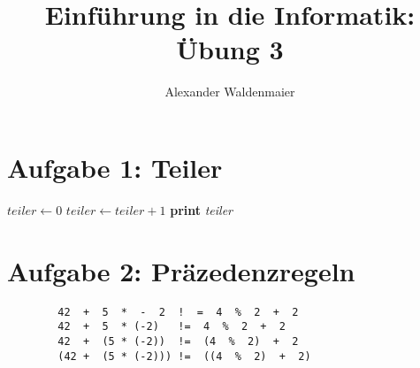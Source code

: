 \documentclass{article}
\title{Einführung in die Informatik: Übung 3}
\author{Alexander Waldenmaier}
\begin{document}
    \maketitle

    \section*{Aufgabe 1: Teiler}
    \begin{algorithm}
        \begin{algorithmic}[1]
                \State $\textit{teiler} \gets 0$
                        \State $\textit{teiler} \gets \textit{teiler}  + 1$
                    \EndIf
                \EndFor
                \State \textbf{print} \textit{teiler}
            \EndFor
            \EndProcedure
            \end{algorithmic}
    \end{algorithm}
   

    \section*{Aufgabe 2: Präzedenzregeln}
    \begin{lstlisting}
        42  +  5  *  -  2  !  =  4  %  2  +  2
        42  +  5  * (-2)   !=  4  %  2  +  2
        42  +  (5 * (-2))  !=  (4  %  2)  +  2
        (42 +  (5 * (-2))) !=  ((4  %  2)  +  2)
    \end{lstlisting}
\end{document}
